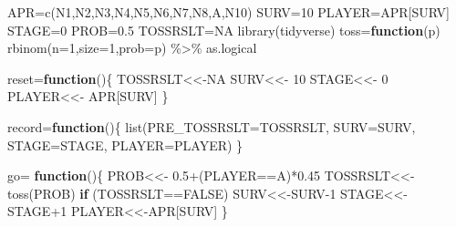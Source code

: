 \documentclass[
  12pt,
]{article}
\newenvironment{Shaded}{\begin{snugshade}}{\end{snugshade}}
\newcommand{\AttributeTok}[1]{\textcolor[rgb]{0.77,0.63,0.00}{#1}}
\newcommand{\ConstantTok}[1]{\textcolor[rgb]{0.00,0.00,0.00}{#1}}
\newcommand{\ControlFlowTok}[1]{\textcolor[rgb]{0.13,0.29,0.53}{\textbf{#1}}}
\newcommand{\DecValTok}[1]{\textcolor[rgb]{0.00,0.00,0.81}{#1}}
\newcommand{\FloatTok}[1]{\textcolor[rgb]{0.00,0.00,0.81}{#1}}
\newcommand{\FunctionTok}[1]{\textcolor[rgb]{0.00,0.00,0.00}{#1}}
\newcommand{\NormalTok}[1]{#1}
\newcommand{\OtherTok}[1]{\textcolor[rgb]{0.56,0.35,0.01}{#1}}
\newcommand{\SpecialCharTok}[1]{\textcolor[rgb]{0.00,0.00,0.00}{#1}}
\newcommand{\StringTok}[1]{\textcolor[rgb]{0.31,0.60,0.02}{#1}}
\begin{document}
\begin{Shaded}
\begin{Highlighting}[]
\NormalTok{APR}\OtherTok{=}\FunctionTok{c}\NormalTok{(}\StringTok{\textquotesingle{}N1\textquotesingle{}}\NormalTok{,}\StringTok{\textquotesingle{}N2\textquotesingle{}}\NormalTok{,}\StringTok{\textquotesingle{}N3\textquotesingle{}}\NormalTok{,}\StringTok{\textquotesingle{}N4\textquotesingle{}}\NormalTok{,}\StringTok{\textquotesingle{}N5\textquotesingle{}}\NormalTok{,}\StringTok{\textquotesingle{}N6\textquotesingle{}}\NormalTok{,}\StringTok{\textquotesingle{}N7\textquotesingle{}}\NormalTok{,}\StringTok{\textquotesingle{}N8\textquotesingle{}}\NormalTok{,}\StringTok{\textquotesingle{}A\textquotesingle{}}\NormalTok{,}\StringTok{\textquotesingle{}N10\textquotesingle{}}\NormalTok{)}
\NormalTok{SURV}\OtherTok{=}\DecValTok{10}
\NormalTok{PLAYER}\OtherTok{=}\NormalTok{APR[SURV]}
\NormalTok{STAGE}\OtherTok{=}\DecValTok{0}
\NormalTok{PROB}\OtherTok{=}\FloatTok{0.5}
\NormalTok{TOSSRSLT}\OtherTok{=}\ConstantTok{NA}
\FunctionTok{library}\NormalTok{(tidyverse)}
\NormalTok{toss}\OtherTok{=}\ControlFlowTok{function}\NormalTok{(p) }\FunctionTok{rbinom}\NormalTok{(}\AttributeTok{n=}\DecValTok{1}\NormalTok{,}\AttributeTok{size=}\DecValTok{1}\NormalTok{,}\AttributeTok{prob=}\NormalTok{p) }\SpecialCharTok{\%\textgreater{}\%}\NormalTok{ as.logical}

\NormalTok{reset}\OtherTok{=}\ControlFlowTok{function}\NormalTok{()\{}
\NormalTok{  TOSSRSLT}\OtherTok{\textless{}\textless{}{-}}\ConstantTok{NA}
\NormalTok{  SURV}\OtherTok{\textless{}\textless{}{-}} \DecValTok{10}
\NormalTok{  STAGE}\OtherTok{\textless{}\textless{}{-}} \DecValTok{0}
\NormalTok{  PLAYER}\OtherTok{\textless{}\textless{}{-}}\NormalTok{ APR[SURV]}
\NormalTok{\}}

\NormalTok{record}\OtherTok{=}\ControlFlowTok{function}\NormalTok{()\{}
  \FunctionTok{list}\NormalTok{(}\AttributeTok{PRE\_TOSSRSLT=}\NormalTok{TOSSRSLT, }\AttributeTok{SURV=}\NormalTok{SURV, }\AttributeTok{STAGE=}\NormalTok{STAGE, }\AttributeTok{PLAYER=}\NormalTok{PLAYER)}
\NormalTok{\}}

\NormalTok{go}\OtherTok{=} \ControlFlowTok{function}\NormalTok{()\{}
\NormalTok{  PROB}\OtherTok{\textless{}\textless{}{-}} \FloatTok{0.5}\SpecialCharTok{+}\NormalTok{(PLAYER}\SpecialCharTok{==}\StringTok{\textquotesingle{}A\textquotesingle{}}\NormalTok{)}\SpecialCharTok{*}\FloatTok{0.45}
\NormalTok{  TOSSRSLT}\OtherTok{\textless{}\textless{}{-}}\FunctionTok{toss}\NormalTok{(PROB)}
  \ControlFlowTok{if}\NormalTok{ (TOSSRSLT}\SpecialCharTok{==}\ConstantTok{FALSE}\NormalTok{) SURV}\OtherTok{\textless{}\textless{}{-}}\NormalTok{SURV}\DecValTok{{-}1}  
\NormalTok{  STAGE}\OtherTok{\textless{}\textless{}{-}}\NormalTok{STAGE}\SpecialCharTok{+}\DecValTok{1}
\NormalTok{  PLAYER}\OtherTok{\textless{}\textless{}{-}}\NormalTok{APR[SURV]}
\NormalTok{\}}


\end{Highlighting}
\end{Shaded}
\end{document}
